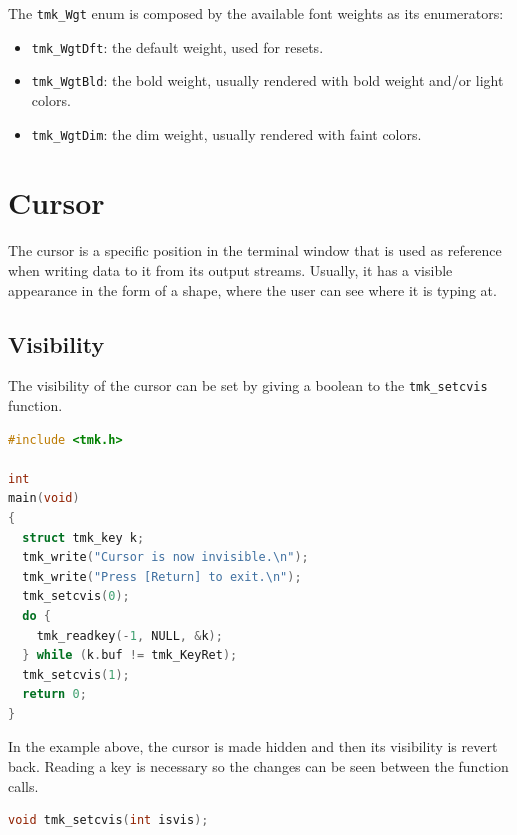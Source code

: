 \documentclass{report}
\begin{document}
The \texttt{tmk\_Wgt} enum is composed by the available font weights as its enumerators:
\begin{itemize}
  \item \texttt{tmk\_WgtDft}: the default weight, used for resets.
  \item \texttt{tmk\_WgtBld}: the bold weight, usually rendered with bold weight and/or light colors.
  \item \texttt{tmk\_WgtDim}: the dim weight, usually rendered with faint colors.
\end{itemize}
\section{Cursor}
The cursor is a specific position in the terminal window that is used as reference when writing data to it from its output streams. Usually, it has a visible appearance in the form of a shape, where the user can see where it is typing at.
\subsection{Visibility}
The visibility of the cursor can be set by giving a boolean to the \texttt{tmk\_setcvis} function.
\begin{lstlisting}[language=c,caption=an example that sets the cursor visibility.]
#include <tmk.h>

int
main(void)
{
  struct tmk_key k;
  tmk_write("Cursor is now invisible.\n");
  tmk_write("Press [Return] to exit.\n");
  tmk_setcvis(0);
  do {
    tmk_readkey(-1, NULL, &k);
  } while (k.buf != tmk_KeyRet);
  tmk_setcvis(1);
  return 0;
}
\end{lstlisting}

In the example above, the cursor is made hidden and then its visibility is revert back. Reading a key is necessary so the changes can be seen between the function calls.
\begin{lstlisting}[language=c,caption=the declaration of the \texttt{tmk\_setcvis} function.]
void tmk_setcvis(int isvis);
\end{lstlisting}
\end{document}

